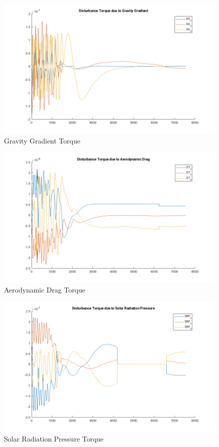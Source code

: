 \documentclass[11pt,a4paper]{report}
\begin{document}
\begin{figure}[H]
 \centering
 \includegraphics[scale=0.5]{gfx/results/gravitygradient.png}
 \caption{Gravity Gradient Torque} 
 \label{fig:gravitygradienttorque}
\end{figure}

\begin{figure}[H]
 \centering
 \includegraphics[scale=0.5]{gfx/results/dragtorque.png}
 \caption{Aerodynamic Drag Torque} 
 \label{fig:dragtorque}
\end{figure}

\begin{figure}[H]
 \centering
 \includegraphics[scale=0.5]{gfx/results/srp.png}
 \caption{Solar Radiation Pressure Torque} 
 \label{fig:srptorque}
\end{figure}
\end{document}

